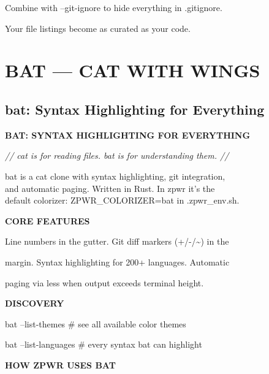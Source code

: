 \documentclass[11pt,a4paper,twoside]{book}
\begin{document}
Combine with --git-ignore to hide everything in .gitignore.

Your file listings become as curated as your code.


\vspace{16pt}


\chapter{BAT — CAT WITH WINGS}

\section{bat: Syntax Highlighting for Everything}


\vspace{10pt}
{\large\bfseries\color{neoncyan} BAT: SYNTAX HIGHLIGHTING FOR EVERYTHING}\vspace{6pt}

{\small\itshape\color{dimtext} // cat is for reading files. bat is for understanding them. //}

\begin{codebox}
bat is a cat clone with syntax highlighting, git integration,\\
and automatic paging. Written in Rust. In zpwr it's the\\
default colorizer: ZPWR\_COLORIZER=bat in .zpwr\_env.sh.\\
\end{codebox}


\vspace{12pt}
{\bfseries\color{neonyellow} CORE FEATURES}\vspace{4pt}

Line numbers in the gutter. Git diff markers (+/-/\textasciitilde{}) in the

margin. Syntax highlighting for 200+ languages. Automatic

paging via less when output exceeds terminal height.


\vspace{12pt}
{\bfseries\color{neonyellow} DISCOVERY}\vspace{4pt}

bat --list-themes    \# see all available color themes

bat --list-languages \# every syntax bat can highlight


\vspace{12pt}
{\bfseries\color{neonyellow} HOW ZPWR USES BAT}\vspace{4pt}
\end{document}
